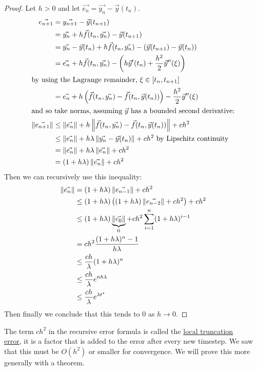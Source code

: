 \documentclass[../Main.tex]{subfiles}
\begin{document}
\begin{proof}
    Let $h > 0$ and let $\vec{e_n} = \vec{y_n} - \vec{y}(t_n)$.
    \begin{align*}
        \vec{e_{n+1}} &= \vec{y_{n+1}} - \vec{y}(t_{n+1}) \\
        &= \vec{y_n} + h \vec{f}(t_n, \vec{y_n}) - \vec{y}(t_{n+1}) \\
        &= \vec{y_n} - \vec{y}(t_n) + h \vec{f}(t_n, \vec{y_n}) - \left(\vec{y}(t_{n+1}) - \vec{y}(t_n)\right) \\
        &= \vec{e_n} + h \vec{f}(t_n, \vec{y_n}) - \left(h \vec{y}'(t_n) + \frac{h^2}{2} \vec{y}''(\xi)\right) \\
        \intertext{by using the Lagrange remainder, $\xi \in [t_n, t_{n+1}]$}
        &= \vec{e_n} + h \left(\vec{f}(t_n, \vec{y_n}) - \vec{f}(t_n, \vec{y}(t_n))\right) - \frac{h^2}{2} \vec{y}''(\xi) \\
        \intertext{and so take norms, assuming $\vec{y}$ has a bounded second derivative:}
        \left\|\vec{e_{n+1}}\right\| &\leq \left\|\vec{e_n}\right\| + h \left\|\vec{f}(t_n, \vec{y_n}) - \vec{f}(t_n, \vec{y}(t_n))\right\| + ch^2 \\
        &\leq \left\|\vec{e_n}\right\| + h \lambda\left\|\vec{y_n} - \vec{y}(t_n)\right\| + ch^2 \text{ by Lipschitz continuity} \\
        &= \left\|\vec{e_n}\right\| + h \lambda\left\|\vec{e_n}\right\| + ch^2 \\
        &= \left(1 + h \lambda\right)\left\|\vec{e_n}\right\| + ch^2
    \end{align*}
    Then we can recursively use this inequality:
    \begin{align*}
        \left\|\vec{e_n}\right\| &=(1 + h \lambda) \left\|\vec{e_{n-1}}\right\| + ch^2 \\
        &\leq (1 + h\lambda) \left((1 + h\lambda) \left\|\vec{e_{n-2}}\right\| + ch^2\right) + ch^2 \\
        &\leq (1 + h\lambda) \underbrace{\left\|\vec{e_0}\right\|}_0 + ch^2 \sum_{i=1}^{n} (1 + h\lambda)^{i-1} \\
        &= ch^2 \frac{(1 + h\lambda)^n - 1}{h\lambda} \\
        &\leq \frac{ch}{\lambda} (1 + h\lambda)^n \\
        &\leq \frac{ch}{\lambda} e^{nh\lambda} \\
        &\leq \frac{ch}{\lambda} e^{\lambda t^\star}
    \end{align*}
    Then finally we conclude that this tends to $0$ as $h \to 0$.
\end{proof}
\begin{remark}
    The term $ch^2$ in the recursive error formula is called the \underline{local truncation}\\\underline{error}, it is a factor that is added to the error after every new timestep. We saw that this must be $O(h^2)$ or smaller for convergence. We will prove this more generally with a theorem.
\end{remark}
\end{document}
